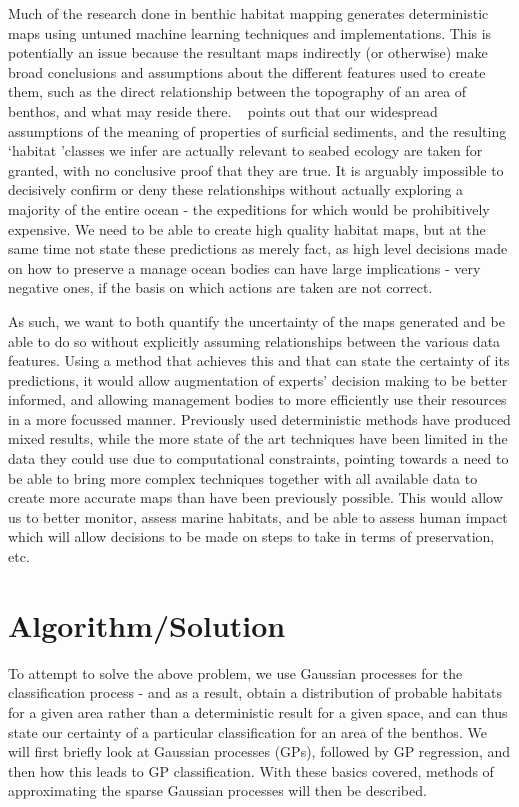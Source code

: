 \documentclass[10pt,sts]{article}
\begin{document}
\begin{multicols}{2}
    Much of the research done in benthic habitat mapping generates deterministic maps using untuned machine learning techniques and implementations. This is potentially an issue  because the resultant maps indirectly (or otherwise) make broad conclusions and assumptions about the different features used to create them, such as the direct relationship between the topography of an area of benthos, and what may reside there. ~\citet{kostylev12} points out that our widespread assumptions of the meaning of properties of surficial sediments, and the resulting \lq habitat \rq classes we infer are actually relevant to seabed ecology are taken for granted, with no conclusive proof that they are true. It is arguably impossible to decisively confirm or deny these relationships without actually exploring a majority of the entire ocean - the expeditions for which would be prohibitively expensive. We need to be able to create high quality habitat maps, but at the same time not state these predictions as merely fact, as high level decisions made on how to preserve a manage ocean bodies can have large implications - very negative ones, if the basis on which actions are taken are not correct.

    As such, we want to both quantify the uncertainty of the maps generated and be able to do so without explicitly assuming relationships between the various data features. Using a method that achieves this and that can state the certainty of its predictions, it would allow augmentation of experts' decision making to be better informed, and allowing management bodies to more efficiently use their resources in a more focussed manner. Previously used deterministic methods have produced mixed results, while the more state of the art techniques have been limited in the data they could use due to computational constraints, pointing towards a need to be able to bring more complex techniques together with all available data to create more accurate maps than have been previously possible. This would allow us to better monitor, assess marine habitats, and be able to assess human impact which will allow decisions to be made on steps to take in terms of preservation, etc.

    \newpage

    \section{Algorithm/Solution}

    To attempt to solve the above problem, we use Gaussian processes for the classification process - and as a result, obtain a distribution of probable habitats for a given area rather than a deterministic result for a given space, and can thus state our certainty of a particular classification for an area of the benthos. We will first briefly look at Gaussian processes (GPs), followed by GP regression, and then how this leads to GP classification. With these basics covered, methods of approximating the sparse Gaussian processes will then be described. 


\end{multicols}
\end{document}
